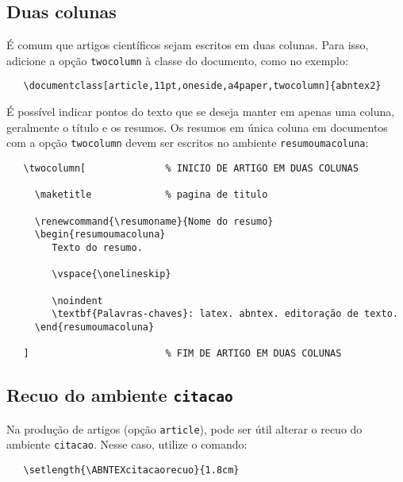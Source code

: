 \documentclass[article,11pt,oneside,a4paper,english]{abntex2}
\begin{document}
\subsection{Duas colunas}

É comum que artigos científicos sejam escritos em duas colunas. Para isso,
adicione a opção \texttt{twocolumn} à classe do documento, como no exemplo:

\begin{verbatim}
   \documentclass[article,11pt,oneside,a4paper,twocolumn]{abntex2}
\end{verbatim}

É possível indicar pontos do texto que se deseja manter em apenas uma coluna,
geralmente o título e os resumos. Os resumos em única coluna em documentos com
a opção \texttt{twocolumn} devem ser escritos no ambiente
\texttt{resumoumacoluna}:

\begin{verbatim}
   \twocolumn[              % INICIO DE ARTIGO EM DUAS COLUNAS

     \maketitle             % pagina de titulo

     \renewcommand{\resumoname}{Nome do resumo}
     \begin{resumoumacoluna}
        Texto do resumo.
      
        \vspace{\onelineskip}
 
        \noindent
        \textbf{Palavras-chaves}: latex. abntex. editoração de texto.
     \end{resumoumacoluna}
   
   ]                        % FIM DE ARTIGO EM DUAS COLUNAS
\end{verbatim}

\subsection{Recuo do ambiente \texttt{citacao}}

Na produção de artigos (opção \texttt{article}), pode ser útil alterar o recuo
do ambiente \texttt{citacao}. Nesse caso, utilize o comando:

\begin{verbatim}
   \setlength{\ABNTEXcitacaorecuo}{1.8cm}
\end{verbatim}
\end{document}
